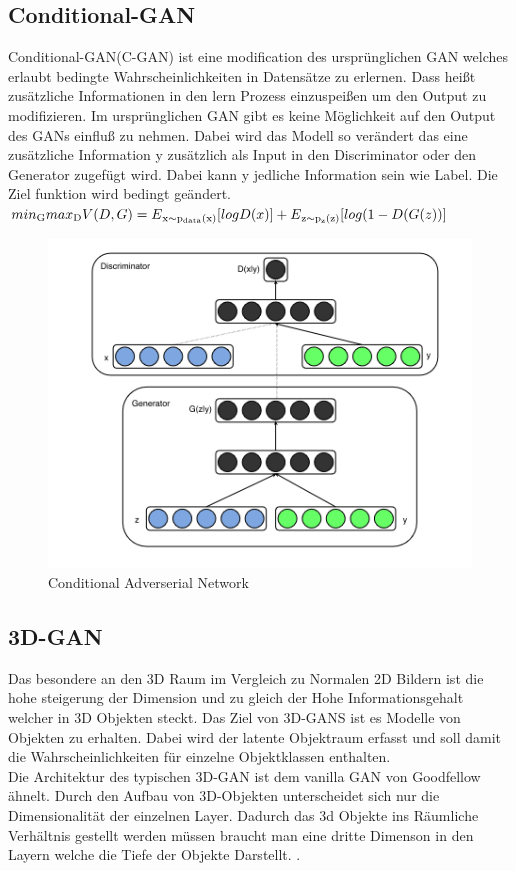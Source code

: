\documentclass{llncs}
\begin{document}
\subsection{Conditional-GAN}
Conditional-GAN(C-GAN) ist eine modification des ursprünglichen GAN welches erlaubt bedingte Wahrscheinlichkeiten in Datensätze zu erlernen. Dass heißt zusätzliche Informationen in den lern Prozess einzuspeißen um den Output zu modifizieren. Im ursprünglichen GAN gibt es keine Möglichkeit auf den Output des GANs einfluß zu nehmen. Dabei wird das Modell so verändert das eine zusätzliche Information y zusätzlich als Input in den Discriminator oder den Generator zugefügt wird. Dabei kann y jedliche Information sein wie Label.
Die Ziel funktion wird bedingt geändert.
\begin{math}
min\textsubscript{G} max\textsubscript{D}V(D,G)=E\textsubscript{x$\sim$p\textsubscript{data}(x)}[logD(x)]  + E\textsubscript{z$\sim$p\textsubscript{z}(z)}[log(1-D(G(z))]
\\\\             
\end{math}

\begin{figure}[htbp] 
	\centering
	\includegraphics[width=1.2\textwidth]{cgan.png}
	\caption{Conditional Adverserial Network}
	\label{fig:Bild2}
\end{figure}

\subsection{3D-GAN}
Das besondere an den 3D Raum im Vergleich zu Normalen 2D Bildern ist die hohe steigerung der Dimension und zu gleich der Hohe Informationsgehalt welcher in 3D Objekten steckt. Das Ziel von 3D-GANS ist es Modelle von Objekten zu erhalten. Dabei wird der latente Objektraum erfasst und soll damit die Wahrscheinlichkeiten für einzelne Objektklassen enthalten. 
\\
Die Architektur des typischen 3D-GAN ist dem vanilla GAN von Goodfellow ähnelt. Durch den Aufbau von 3D-Objekten unterscheidet sich nur die Dimensionalität der einzelnen Layer. Dadurch das 3d Objekte ins Räumliche Verhältnis gestellt werden müssen braucht man eine dritte Dimenson in den Layern welche die Tiefe der Objekte Darstellt. \cite{3d}. 
\end{document}
